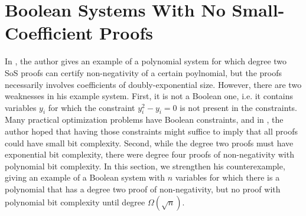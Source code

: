 \section{Boolean Systems With No Small-Coefficient Proofs}\label{sec:counterexample}
In \cite{odonnell17}, the author gives an example of a polynomial system for which degree two SoS proofs can certify non-negativity of a certain poylnomial, but the proofs necessarily involves coefficients of doubly-exponential size. However, there are two weaknesses in his example system. First, it is not a Boolean one, i.e. it contains variables $y_i$ for which the constraint $y_i^2 - y_i = 0$ is not present in the constraints. Many practical optimization problems have Boolean constraints, and in \cite{odonnell17}, the author hoped that having those constraints might suffice to imply that all proofs could have small bit complexity. Second, while the degree two proofs must have exponential bit complexity, there were degree four proofs of non-negativity with polynomial bit complexity. 
%
%
In this section, we strengthen his counterexample, giving an example of a Boolean system with $n$ variables for which there is a polynomial that has a degree two proof of non-negativity, but no proof with polynomial bit complexity until degree $\Omega(\sqrt{n})$.

